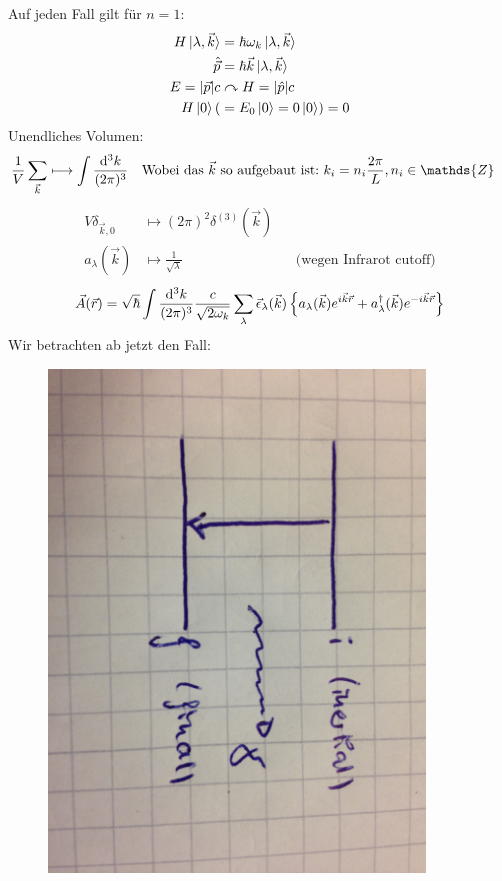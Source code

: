 	Auf jeden Fall gilt für $n=1$:
		\begin{align*}
			H \ket{\lambda, \vec{k}} &= \hbar \omega_k \ket{\lambda , \vec{k}} \\
			\hat{\vec{p}} &= \hbar \vec{k} \ket{\lambda , \vec{k}} \\
			E = |\vec{p}| c &\curvearrowright H = |\hat{p}| c \\
			H \ket{0} (&= E_0 \ket{0} = 0 \ket{0} ) = 0
 		\end{align*}
 	Unendliches Volumen: 
	 	\begin{align*}
		 	\frac{1}{V} \sum_{\vec{k}} &\longmapsto \int \frac{\diff^3 k}{(2 \pi)^3}
		 	& \text{Wobei das~} \vec{k} \text{~so aufgebaut ist:~}k_i &= n_i \frac{2 \pi}{L}, n_i \in \mathds{Z}
	 	\end{align*} 
		\begin{align*}
			V \delta_{\vec{k} , 0} &\longmapsto (2 \pi)^2 \delta^{(3)} (\vec{k}) \\
			a_\lambda (\vec{k}) &\longmapsto \frac{1}{\sqrt{\lambda}} 
			& &\text{(wegen Infrarot cutoff)}
		\end{align*} 
		\begin{align*}
			\vec{A} (\vec{r}) =
			\sqrt{\hbar} \int \frac{\mathrm{d}^3 k}{(2 \pi)^3} \frac{c}{\sqrt{2 \omega_k}}
			\sum_\lambda \vec{\epsilon}_\lambda (\vec{k})
			\left\{ a_\lambda (\vec{k}) e^{i \vec{k} \vec{r}}
			+ a^\dagger_\lambda (\vec{k}) e^{-i \vec{k} \vec{r}}
			\right\}
		\end{align*}
	Wir betrachten ab jetzt den Fall: 
		\begin{figure} [ht]
			\begin{center}
				\includegraphics[width=10cm]{Bild2.jpg}
			\end{center}
		\end{figure}
